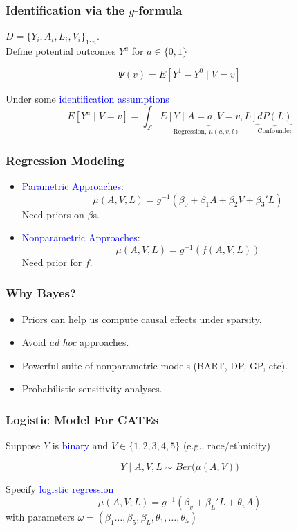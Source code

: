\documentclass[xcolor=x11names,compress]{beamer}
\renewcommand{\(}{\begin{columns}}
\renewcommand{\)}{\end{columns}}
\newcommand{\<}[1]{\begin{column}{#1}}
\renewcommand{\>}{\end{column}}
\begin{document}
\begin{frame}
	\frametitle{Identification via the $g$-formula}
	$D = \{Y_i, A_i, L_i, V_i \}_{1:n}$. \\ 
	Define potential outcomes $Y^a$ for $a\in\{0,1\}$
	
	 
	$$\Psi(v) =  E[ Y^1 - Y^0 \mid V=v ]$$
	
	  
	Under some \textcolor{blue}{identification assumptions}
	$$ E[Y^a \mid V=v] = \int_{\mathcal{L}} \underbrace{E[ Y\mid A=a, V=v, L ]}_{\text{Regression, $\mu(a, v, l)$ }} \underbrace{dP(L)}_{ \text{Confounder} }  $$
\end{frame}

\begin{frame}
	\frametitle{Regression Modeling}

\begin{itemize}
	\item	\textcolor{blue}{Parametric Approaches}:
	$$ \mu(A, V, L) = g^{-1}( \beta_0 +  \beta_1 A + \beta_2 V + \beta_3' L ) $$
	Need priors on $\beta$s.
	
	\item \textcolor{blue}{Nonparametric Approaches}:
	$$ \mu(A, V, L) = g^{-1}( f(A, V,  L)   ) $$	
	Need prior for $f$.
\end{itemize}
	
\end{frame}

\begin{frame}
	\frametitle{Why Bayes?}
	
	\begin{itemize}
		\item Priors can help us compute causal effects under sparsity.
		\item Avoid \textit{ad hoc} approaches.
		\item Powerful suite of nonparametric models (BART, DP, GP, etc).
		\item Probabilistic sensitivity analyses.
	\end{itemize}
\end{frame}

\begin{frame}
	\frametitle{Logistic Model For CATEs}
	Suppose $Y$ is \textcolor{blue}{binary} and $V\in\{1,2,3,4,5 \} $ (e.g., race/ethnicity)
	
	$$ Y \mid A, V, L \sim Ber \big( \mu(A, V) \big) $$
	 
	Specify \textcolor{blue}{logistic regression}
	$$ \mu(A, V, L) = g^{-1}( \beta_v + \beta_L' L +  \theta_v A ) $$
	with parameters $\omega = ( \beta_1\dots, \beta_5, \beta_L, \theta_1, \dots,\theta_5 )$ 
\end{frame}
\end{document}
